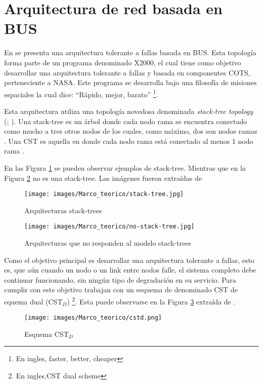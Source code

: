  \section{Arquitectura de red basada en BUS}\label{sec:bus}
En \cite{Tai99} se presenta una arquitectura tolerante a fallas basada en BUS. Esta topología forma parte de un programa denominado X2000, el cual tiene como objetivo desarrollar una arquitectura tolerante a fallas y basada en componentes COTS, perteneciente a \ac{NASA}. Este programa se desarrolla bajo una filosofía de misiones espaciales la cual dice: ``Rápido, mejor, barato'' \footnote{En ingles, faster, better, cheaper}.

Esta arquitectura utiliza una topología novedosa denominada \textit{stack-tree topology} (\citep{Chau99}; \citep{Tai99}). Una stack-tree es un árbol donde cada nodo rama se encuentra conectado como mucho a tres otros nodos de los cuales, como máximo, dos son nodos ramas \citep{Tai99}. Una \ac{CST} es aquella en donde cada nodo rama está conectado al menos 1 nodo rama \citep{Tai99}.

En las Figura \ref{fig:stack-tree} se pueden observar ejemplos de stack-tree. Mientras que en la Figura \ref{fig:no-stack-tree} no es una stack-tree. Las imágenes fueron extraídas de \cite{Tai99}

\begin{figure}[h]
 \centering
 \texttt{[image: images/Marco\_teorico/stack-tree.jpg]}
  \caption{Arquitecturas stack-trees}
\label{fig:stack-tree}
\end{figure}

\begin{figure}[h]
 \centering
 \texttt{[image: images/Marco\_teorico/no-stack-tree.jpg]}
  \caption{Arquitecturas que no responden al modelo stack-trees}
\label{fig:no-stack-tree}
\end{figure}

Como el objetivo principal es desarrollar una arquitectura tolerante a fallas, esto es, que aún cuando un nodo o un link entre nodos falle, el sistema completo debe continuar funcionando, sin ningún tipo de degradación en su servicio. Para cumplir con este objetivo \cite{Tai99} trabajan con un esquema de denominado \ac{CST} de equema dual (\ac{CST}$_D$) \footnote{En ingles,\ac{CST} dual scheme}. Esta puede observarse en la Figura \ref{fig:cstd} extraída de \cite{Tai99}.

\begin{figure}[h]
 \centering
 \texttt{[image: images/Marco\_teorico/cstd.png]}
  \caption{Esquema CST$_D$}
\label{fig:cstd}
\end{figure}


